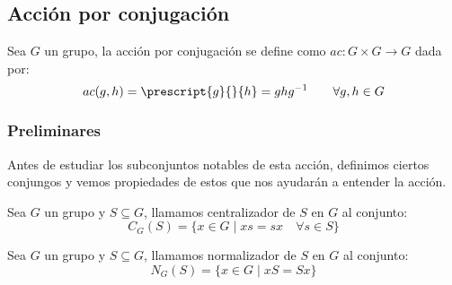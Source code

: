 \subsection{Acción por conjugación}
\noindent
Sea $G$ un grupo, la acción por conjugación se define como $ac:G\times G\to G$ dada por:
\begin{equation*}
    ac(g,h) = \prescript{g}{}{h} = ghg^{-1} \qquad \forall g,h\in G
\end{equation*}

\subsubsection{Preliminares}
\noindent
Antes de estudiar los subconjuntos notables de esta acción, definimos ciertos conjungos y vemos propiedades de estos que nos ayudarán a entender la acción.

\begin{definicion}[Centralizador]
    Sea $G$ un grupo y $S\subseteq G$, llamamos centralizador de $S$ en $G$ al conjunto:
    \begin{equation*}
        C_G(S) = \{x\in G \mid xs = sx \quad \forall s\in S\}
    \end{equation*}
\end{definicion}

\begin{definicion}[Normalizador]
    Sea $G$ un grupo y $S\subseteq G$, llamamos normalizador de $S$ en $G$ al conjunto:
    \begin{equation*}
        N_G(S) = \{x\in G \mid xS = Sx\}
    \end{equation*}
\end{definicion}

